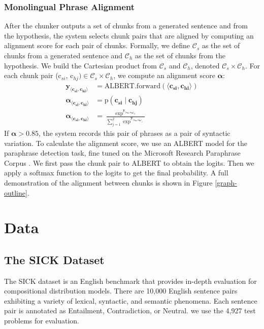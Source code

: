 \documentclass[11pt,a4paper]{article}
\newcommand{\yy}{\mathbf{y}}
\begin{document}
 \subsubsection{Monolingual Phrase Alignment}
After the chunker outputs a set of chunks from a generated sentence and from the hypothesis, the system selects chunk pairs that are aligned by computing an alignment score for each pair of chunks. Formally, we define $\mathcal{C}_s$ as the set of chunks from a generated sentence and $\mathcal{C}_h$ as the set of chunks from the hypothesis. We build the Cartesian product from $\mathcal{C}_s$ and $\mathcal{C}_h$, denoted  $\mathcal{C}_s \times \mathcal{C}_h$. For each chunk pair ($\mathrm{c}_{si}$, $\mathrm{c}_{hj}) \in \mathcal{C}_s \times \mathcal{C}_h$, we compute an alignment score
$\boldsymbol{\alpha}$: 
\begin{align*}
    \yy_{\langle \mathbf{c_{si}}, \mathbf{c_{hi}} \rangle} &= \mathrm{ALBERT}.\mathrm{forward}(\langle \mathbf{c_{si}}, \mathbf{c_{hi}} \rangle) \\
    \boldsymbol{\alpha}_{\langle \mathbf{c_{si}}, \mathbf{c_{hi}} \rangle} &= \mathrm{p}(\mathbf{c_{si}} \mid \mathbf{c_{hj}}) \\
    \boldsymbol{\alpha}_{\langle \mathbf{c_{si}}, \mathbf{c_{hi}} \rangle} &= \frac{\exp^{\yy_{\langle \mathbf{c_{si}}, \mathbf{c_{hi}} \rangle_0}}}{\sum_{j=1}^2 \exp^{\yy_{\langle \mathbf{c_{si}}, \mathbf{c_{hi}} \rangle_ j}}}
\end{align*}
If $\boldsymbol{\alpha} > 0.85$, the system records this pair of phrases as a pair of syntactic variation. To calculate the alignment score, we use an ALBERT \cite{Lan2020ALBERT:} model for the paraphrase detection task, fine tuned on the Microsoft Research Paraphrase Corpus \cite{dolan-brockett-2005-automatically}. We first pass the chunk pair to ALBERT to obtain the logits. Then we apply a softmax function to the logits to get the final probability. A full demonstration of the alignment between chunks is shown in Figure \ref{graph-outline}.

\section{Data}
\subsection{The SICK Dataset}
The SICK \cite{marelli-etal-2014-sick} dataset is an English benchmark that provides in-depth evaluation for compositional distribution models. There are 10,000 English sentence pairs exhibiting a variety of lexical, syntactic, and semantic phenomena. Each sentence pair is annotated as Entailment, Contradiction, or Neutral. we use the 4,927 test problems for evaluation.
\end{document}
